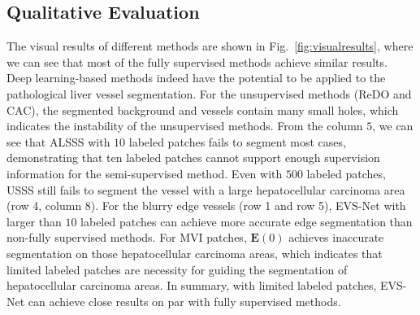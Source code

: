 \documentclass[letterpaper]{article} %
\begin{document}
\subsection{Qualitative Evaluation}

The visual results of different methods are shown in Fig.~\ref{fig:visualresults},
where we can see that most of the fully supervised methods achieve similar results.
Deep learning-based methods indeed have the potential to be applied to the pathological liver vessel segmentation.
For the unsupervised methods (ReDO and CAC), the segmented background and vessels contain many small holes, which indicates the instability of the unsupervised methods.
From the column $5$, we can see that ALSSS with $10$ labeled patches fails to segment most cases, demonstrating that ten labeled patches cannot support enough supervision information for the semi-supervised method. Even with $500$ labeled patches, USSS still fails to segment the vessel with a large hepatocellular carcinoma area (row 4, column 8).
For the blurry edge vessels (row 1 and row 5), EVS-Net with larger than $10$ labeled patches can achieve more accurate edge segmentation than non-fully supervised methods.
For MVI patches, $\mathbf{E}(0)$ achieves inaccurate segmentation on those hepatocellular carcinoma areas,
which indicates that limited labeled patches are necessity for guiding the segmentation of hepatocellular carcinoma areas.
In summary, with limited labeled patches, EVS-Net can achieve close results on par with fully supervised methods.
\end{document}
